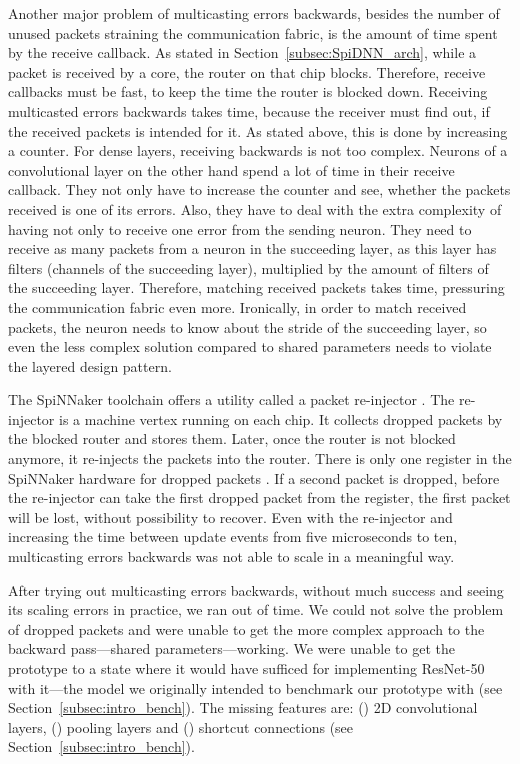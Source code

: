 \documentclass[]{article}
\begin{document}
Another major problem of multicasting errors backwards, besides the
number of unused packets straining the communication fabric, is
the amount of time spent by the receive callback.
As stated in Section~\ref{subsec:SpiDNN_arch}, while a packet is
received by a core, the router on that chip blocks.
Therefore, receive callbacks must be fast, to keep the time the router
is blocked down.
Receiving multicasted errors backwards takes time, because the
receiver must find out, if the received packets is intended for
it.
As stated above, this is done by increasing a counter.
For dense layers, receiving backwards is not too complex.
Neurons of a convolutional layer on the other hand spend a lot of
time in their receive callback.
They not only have to increase the counter and see, whether the
packets received is one of its errors.
Also, they have to deal with the extra complexity of having not only
to receive one error from the sending neuron.
They need to receive as many packets from a neuron in the succeeding
layer, as this layer has filters (channels of the succeeding layer),
multiplied by the amount of filters of the succeeding layer.
Therefore, matching received packets takes time, pressuring the
communication fabric even more.
Ironically, in order to match received packets, the neuron needs to
know about the stride of the succeeding layer, so even the less
complex solution compared to shared parameters needs to violate
the layered design pattern.

The SpiNNaker toolchain offers a utility called a packet re-injector
\citep{furber_et_al_2020}.
The re-injector is a machine vertex running on each chip.
It collects dropped packets by the blocked router and stores them.
Later, once the router is not blocked anymore, it re-injects the
packets into the router.
There is only one register in the SpiNNaker hardware for dropped
packets \citep{furber_et_al_2020}.
If a second packet is dropped, before the re-injector can take the
first dropped packet from the register, the first packet will be lost,
without possibility to recover.
Even with the re-injector and increasing the time between update
events from five microseconds to ten, multicasting errors backwards
was not able to scale in a meaningful way.

After trying out multicasting errors backwards, without much success
and seeing its scaling errors in practice, we ran out of time.
We could not solve the problem of dropped packets and were unable to
get the more complex approach to the backward pass---shared
parameters---working.
We were unable to get the prototype to a state where it would have
sufficed for implementing ResNet-50 with it---the model we originally
intended to benchmark our prototype with
(see Section~\ref{subsec:intro_bench}).
The missing features are: () 2D convolutional layers,
() pooling layers and () shortcut
connections (see Section~\ref{subsec:intro_bench}).
\end{document}

